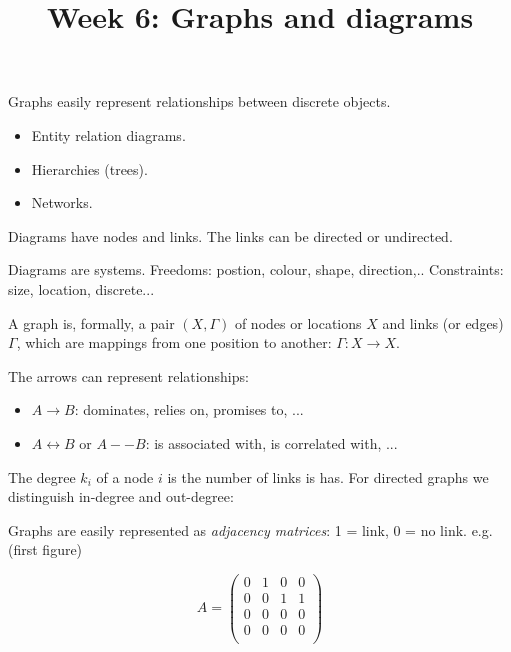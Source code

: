 \documentclass{slides}
\title{Week 6: Graphs and diagrams}
\begin{document}
\maketitle


Graphs easily represent relationships between discrete
objects.

\begin{itemize}
\item Entity relation diagrams.
\item Hierarchies (trees).
\item Networks.
\end{itemize}

Diagrams have nodes and links. The links can be
directed or undirected.

Diagrams are systems. Freedoms: postion, colour, shape, direction,..
Constraints: size, location, discrete...


A graph is, formally, a pair $(X,\Gamma)$ of nodes or locations $X$
and links (or edges) $\Gamma$, which are mappings from one position to
another: $\Gamma: X \rightarrow X$.


The arrows can represent relationships:

\begin{itemize}
\item $A \rightarrow B$: dominates, relies on, promises to, ...
\item $A \leftrightarrow B$ or $A -- B$: is associated with, is correlated with, ...
\end{itemize}


The degree $k_i$ of a node $i$ is the number of links is has. For directed
graphs we distinguish in-degree and out-degree:


Graphs are easily represented as {\em adjacency matrices}: 1 = link, 0 = no link.
e.g. (first figure)

$$
A = \left(\begin{array}{cccc}
0 & 1 & 0 & 0\\
0 & 0 & 1 & 1\\
0 & 0 & 0 & 0\\
0 & 0 & 0 & 0\\
\end{array}\right)
$$
\end{document}
